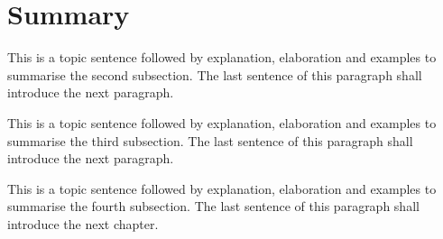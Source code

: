 \section{Summary}
\label{sec:append_1_summary}


This is a topic sentence followed by explanation, elaboration and examples to summarise the second subsection. The last sentence of this paragraph shall introduce the next paragraph. \lipsum[1]

This is a topic sentence followed by explanation, elaboration and examples to summarise the third subsection. The last sentence of this paragraph shall introduce the next paragraph. \lipsum[1]

This is a topic sentence followed by explanation, elaboration and examples to summarise the fourth subsection. The last sentence of this paragraph shall introduce the next chapter. \lipsum[1]







